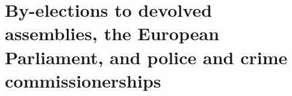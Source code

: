 %
%
%
%
%

\chapter{By-elections to devolved assemblies, the European Parliament, and police and crime commissionerships}

